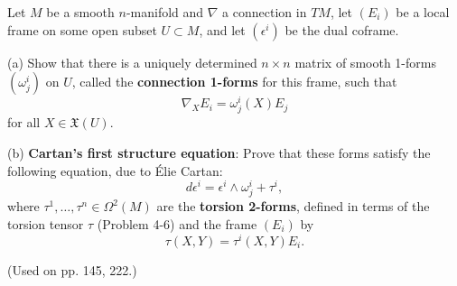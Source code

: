 \begin{exercise}
\label{prob:connection-1forms-cartan}
Let $M$ be a smooth $n$-manifold and $\nabla$ a connection in $TM$, let $(E_i)$ be a local frame on some open subset $U \subset M$, and let $(\epsilon^i)$ be the dual coframe.

(a) Show that there is a uniquely determined $n \times n$ matrix of smooth 1-forms $(\omega^i_j)$ on $U$, called the \textbf{connection 1-forms} for this frame, such that
\[
\nabla_X E_i = \omega^i_j(X) E_j
\]
for all $X \in \mathfrak{X}(U)$.

(b) \textbf{Cartan's first structure equation}: Prove that these forms satisfy the following equation, due to \'Elie Cartan:
\[
d\epsilon^i = \epsilon^i \wedge \omega^i_j + \tau^i,
\]
where $\tau^1, \ldots, \tau^n \in \Omega^2(M)$ are the \textbf{torsion 2-forms}, defined in terms of the torsion tensor $\tau$ (Problem 4-6) and the frame $(E_i)$ by
\[
\tau(X,Y) = \tau^i(X,Y) E_i.
\]

(Used on pp. 145, 222.)
\end{exercise}

